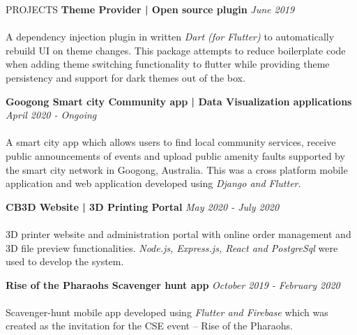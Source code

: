 \documentclass{cv}
\begin{document}
\begin{rSection}{PROJECTS}
    {\bf Theme Provider | Open source plugin}                       \hfill {\em June 2019}
    \\ \\
    A dependency injection plugin in written \textit{Dart (for Flutter)} to automatically rebuild
    UI on theme changes.
    This package attempts to reduce boilerplate code when adding theme switching functionality to flutter
    while providing theme persistency and support for dark themes out of the box. \par\vspace{5pt}

    {\bf Googong Smart city Community app | Data Visualization applications}                  \hfill {\em April 2020 - Ongoing}
    \\ \\
    A smart city app which allows users to find local community services,
    receive public announcements of events and upload public amenity
    faults supported by the smart city network in Googong, Australia.
    This was a cross platform mobile application and web application
    developed using \textit{Django and Flutter}.
    \par\vspace{5pt}

    {\bf CB3D Website | 3D Printing Portal}                  \hfill {\em May 2020 - July 2020}
    \\ \\
    3D printer website and administration portal with online order management and 3D file preview functionalities.
    \textit{Node.js, Express.js, React and PostgreSql} were used to develop the system.
    \par\vspace{5pt}

    {\bf Rise of the Pharaohs Scavenger hunt app}                   \hfill {\em October 2019 - February 2020}
    \\ \\
    Scavenger-hunt mobile app developed using \textit{Flutter and Firebase} which was created as the invitation
    for the CSE event – Rise of the Pharaohs.  \par\vspace{5pt}


\end{rSection}
\end{document}
